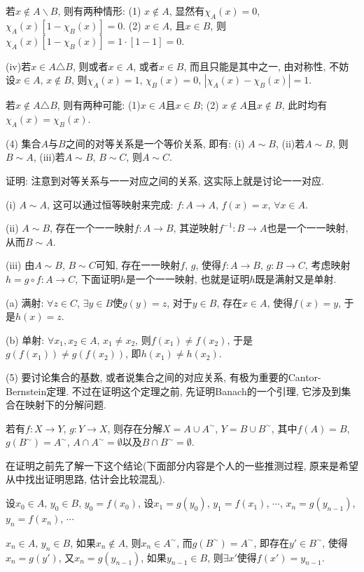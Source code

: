 \documentclass[12pt,a4paper,openany]{book}
\begin{document}
若$x \notin A \backslash B$, 则有两种情形: (1) $x \notin A$, 显然有$\chi_A(x) = 0$, $\chi_A(x)[1 - \chi_B(x)] = 0$. (2) $x \in A$, 且$x \in B$, 则$\chi_A(x)[1 - \chi_B(x)] = 1\cdot[1-1] = 0$.

(iv)若$x \in A \triangle B$, 则或者$x \in A$, 或者$x \in B$, 而且只能是其中之一, 由对称性, 不妨设$x \in A$, $x \notin B$, 则$\chi_A(x) = 1$, $\chi_B(x) = 0$, $|\chi_A(x) - \chi_B(x)| = 1$.

若$x \notin A \triangle B$, 则有两种可能: (1)$x \in A$且$x \in B$; (2) $x \notin A$且$x \notin B$, 此时均有$\chi_A(x) = \chi_B(x)$.

(4) 集合$A$与$B$之间的对等关系是一个等价关系, 即有: (i) $A \sim B$, (ii)若$A \sim B$, 则$B \sim A$, (iii)若$A \sim B$, $B \sim C$, 则$A \sim C$.

证明: 注意到对等关系与一一对应之间的关系, 这实际上就是讨论一一对应.

(i) $A \sim A$, 这可以通过恒等映射来完成: $f:A \rightarrow A$, $f(x) = x$, $\forall x \in A$.

(ii) $A \sim B$, 存在一个一一映射$f: A \rightarrow B$, 其逆映射$f^{-1}:B \rightarrow A$也是一个一一映射, 从而$B \sim A$.

(iii) 由$A \sim B$, $B \sim C$可知, 存在一一映射$f$, $g$, 使得$f: A \rightarrow B$, $g:B \rightarrow C$, 考虑映射$h = g \circ f: A \rightarrow C$, 下面证明$h$是一个一一映射, 也就是证明$h$既是满射又是单射.

(a) 满射: $\forall z \in C$, $\exists y \in B$使$g(y) = z$, 对于$y \in B$, 存在$x \in A$, 使得$f(x) = y$, 于是$h(x) = z$.

(b) 单射: $\forall x_1, x_2 \in A$, $x_1 \neq x_2$, 则$f(x_1) \neq f(x_2)$, 于是$g(f(x_1)) \neq g(f(x_2))$, 即$h(x_1) \neq h(x_2)$.

(5) 要讨论集合的基数, 或者说集合之间的对应关系, 有极为重要的Cantor-Bernstein定理. 不过在证明这个定理之前, 先证明Banach的一个引理, 它涉及到集合在映射下的分解问题.

若有$f: X \rightarrow Y$, $g: Y \rightarrow X$, 则存在分解$X = A \cup A^{\sim}$, $Y = B \cup B^{\sim}$, 其中$f(A) = B$, $g(B^{\sim}) = A^{\sim}$, $A \cap A^{\sim} = \emptyset$以及$B \cap B^{\sim} = \emptyset$.

在证明之前先了解一下这个结论(下面部分内容是个人的一些推测过程, 原来是希望从中找出证明思路, 估计会比较混乱).

设$x_0 \in A$, $y_0 \in B$, $y_0 = f(x_0)$, 设$x_1 = g(y_0)$, $y_1 = f(x_1)$, $\cdots$, $x_n = g(y_{n-1})$, $y_n = f(x_n)$, $\cdots$

$x_n \in A$, $y_n \in B$, 如果$x_n \notin A$, 则$x_n \in A^{\sim}$, 而$g(B^{\sim}) = A^{\sim}$, 即存在$y' \in B^{\sim}$, 使得$x_n = g(y')$, 又$x_n = g(y_{n-1})$, 如果$y_{n-1} \in B$, 则$\exists x'$使得$f(x') = y_{n-1}$.
\end{document}
